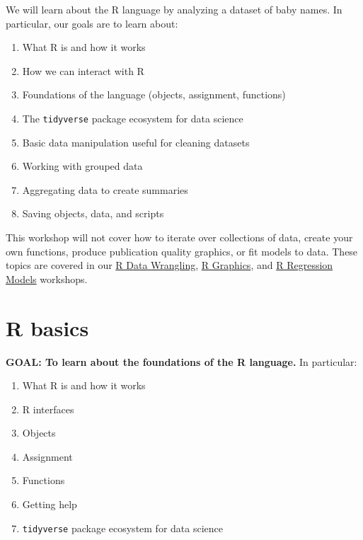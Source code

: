 \documentclass[
]{book}
\providecommand{\tightlist}{%
  \setlength{\itemsep}{0pt}\setlength{\parskip}{0pt}}
\begin{document}
\begin{alert}

We will learn about the R language by analyzing a dataset of baby names.
In particular, our goals are to learn about:

\begin{enumerate}
\def\labelenumi{\arabic{enumi}.}
\tightlist
\item
  What R is and how it works
\item
  How we can interact with R
\item
  Foundations of the language (objects, assignment, functions)
\item
  The \texttt{tidyverse} package ecosystem for data science
\item
  Basic data manipulation useful for cleaning datasets
\item
  Working with grouped data
\item
  Aggregating data to create summaries
\item
  Saving objects, data, and scripts
\end{enumerate}

This workshop will not cover how to iterate over collections of data, create
your own functions, produce publication quality graphics, or fit models to data.
These topics are covered in our \href{./RDataWrangling.html}{R Data Wrangling},
\href{./Rgraphics.html}{R Graphics}, and \href{./Rmodels.html}{R Regression Models} workshops.

\end{alert}

\hypertarget{r-basics}{%
\section{R basics}\label{r-basics}}

\begin{alert}

\textbf{GOAL: To learn about the foundations of the R language.} In particular:

\begin{enumerate}
\def\labelenumi{\arabic{enumi}.}
\tightlist
\item
  What R is and how it works
\item
  R interfaces
\item
  Objects
\item
  Assignment
\item
  Functions
\item
  Getting help
\item
  \texttt{tidyverse} package ecosystem for data science
\end{enumerate}

\end{alert}
\end{document}
